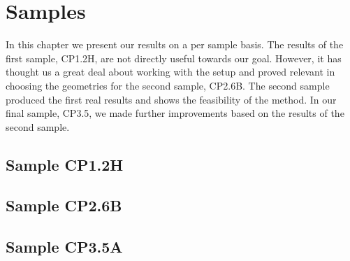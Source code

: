 \chapter{Samples}
In this chapter we present our results on a per sample basis. The results of the first sample, CP1.2H, are not directly useful towards our goal. However, it has thought us a great deal about working with the setup and proved relevant in choosing the geometries for the second sample, CP2.6B. The second sample produced the first real results and shows the feasibility of the method. In our final sample, CP3.5, we made further improvements based on the results of the second sample.

\section{Sample CP1.2H}


\section{Sample CP2.6B}


\section{Sample CP3.5A}
